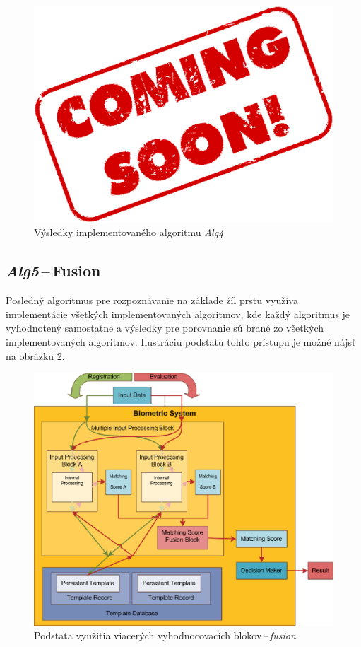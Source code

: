 \documentclass[11pt,a4paper]{article}
\begin{document}
\begin{figure}[ht!]
	\centering
	\includegraphics[width=12cm]{fig/alg4.eps}
	\caption{\label{fig:alg4} Výsledky implementovaného algoritmu \emph{Alg4}}
\end{figure}

\clearpage
\subsection{\emph{Alg5}\,--\,Fusion} \label{Alg5}

Posledný algoritmus pre rozpoznávanie na základe žíl prstu využíva implementácie
všetkých implementovaných algoritmov, kde každý algoritmus je vyhodnotený
samostatne a výsledky pre porovnanie sú brané zo všetkých implementovaných
algoritmov. Ilustráciu podstatu tohto prístupu je možné nájsť na obrázku
\ref{fig:fusion}.

\vfill
\begin{figure}[ht!]
	\centering
	\includegraphics[width=12cm]{fig/fusion.eps}
	\caption{\label{fig:fusion} Podstata využitia viacerých vyhodnocovacích
	blokov\,--\,\emph{fusion}}
\end{figure}
\vfill
\vfill
\end{document}
